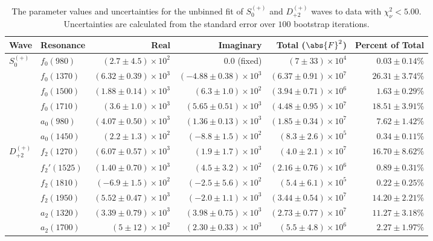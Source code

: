 \begin{table}[ht]
    \begin{center}
        \begin{tabular}{llrrrr}\toprule
        Wave & Resonance & Real & Imaginary & Total ($\abs{F}^2$) & Percent of Total \\\midrule
$S_{0}^{(+)}$ & $f_{0}(980)$ & $(2.7 \pm 4.5) \times 10^{2}$ & $0.0$ (fixed) & $(7 \pm 33) \times 10^{4}$ & $0.03 \pm 0.14 \%$ \\
 & $f_{0}(1370)$ & $(6.32 \pm 0.39) \times 10^{3}$ & $(-4.88 \pm 0.38) \times 10^{3}$ & $(6.37 \pm 0.91) \times 10^{7}$ & $26.31 \pm 3.74 \%$ \\
 & $f_{0}(1500)$ & $(1.88 \pm 0.14) \times 10^{3}$ & $(6.3 \pm 1.0) \times 10^{2}$ & $(3.94 \pm 0.71) \times 10^{6}$ & $1.63 \pm 0.29 \%$ \\
 & $f_{0}(1710)$ & $(3.6 \pm 1.0) \times 10^{3}$ & $(5.65 \pm 0.51) \times 10^{3}$ & $(4.48 \pm 0.95) \times 10^{7}$ & $18.51 \pm 3.91 \%$ \\
 & $a_{0}(980)$ & $(4.07 \pm 0.50) \times 10^{3}$ & $(1.36 \pm 0.13) \times 10^{3}$ & $(1.85 \pm 0.34) \times 10^{7}$ & $7.62 \pm 1.42 \%$ \\
 & $a_{0}(1450)$ & $(2.2 \pm 1.3) \times 10^{2}$ & $(-8.8 \pm 1.5) \times 10^{2}$ & $(8.3 \pm 2.6) \times 10^{5}$ & $0.34 \pm 0.11 \%$ \\
$D_{+2}^{(+)}$ & $f_{2}(1270)$ & $(6.07 \pm 0.57) \times 10^{3}$ & $(1.9 \pm 1.7) \times 10^{3}$ & $(4.0 \pm 2.1) \times 10^{7}$ & $16.70 \pm 8.62 \%$ \\
 & $f_{2}'(1525)$ & $(1.40 \pm 0.70) \times 10^{3}$ & $(4.5 \pm 3.2) \times 10^{2}$ & $(2.16 \pm 0.76) \times 10^{6}$ & $0.89 \pm 0.31 \%$ \\
 & $f_{2}(1810)$ & $(-6.9 \pm 1.5) \times 10^{2}$ & $(-2.5 \pm 5.6) \times 10^{2}$ & $(5.4 \pm 6.1) \times 10^{5}$ & $0.22 \pm 0.25 \%$ \\
 & $f_{2}(1950)$ & $(5.52 \pm 0.47) \times 10^{3}$ & $(-2.0 \pm 1.1) \times 10^{3}$ & $(3.44 \pm 0.54) \times 10^{7}$ & $14.20 \pm 2.21 \%$ \\
 & $a_{2}(1320)$ & $(3.39 \pm 0.79) \times 10^{3}$ & $(3.98 \pm 0.75) \times 10^{3}$ & $(2.73 \pm 0.77) \times 10^{7}$ & $11.27 \pm 3.18 \%$ \\
 & $a_{2}(1700)$ & $(5 \pm 12) \times 10^{2}$ & $(2.30 \pm 0.33) \times 10^{3}$ & $(5.5 \pm 4.8) \times 10^{6}$ & $2.27 \pm 1.97 \%$ \\\bottomrule
        \end{tabular}
    \caption{The parameter values and uncertainties for the unbinned fit of $S_{0}^{(+)}$ and $D_{+2}^{(+)}$ waves to data with $\chi^2_\nu < 5.00$. Uncertainties are calculated from the standard error over $100$ bootstrap iterations.}\label{tab:unbinned-fit-chisqdof-5.0-Sp0p-Dp2p}
    \end{center}
\end{table}
